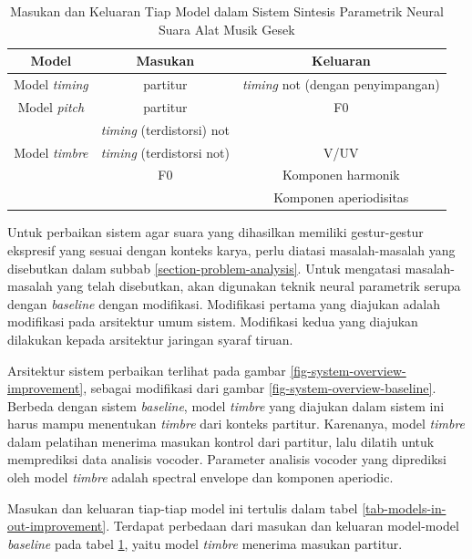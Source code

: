 \begin{table}[h]
    \centering
    \caption{Masukan dan Keluaran Tiap Model dalam Sistem Sintesis Parametrik Neural Suara Alat Musik Gesek }\label{tab-models-in-out-baseline}
    \begin{tabular}{ |c|c|c| } 
     \hline
     Model & Masukan & Keluaran \\
     \hline 
     Model \textit{timing} & partitur & \textit{timing} not (dengan penyimpangan) \\ 
     \hline
     Model \textit{pitch} & partitur & F0 \\ 
      & \textit{timing} (terdistorsi) not  & \\ 
     \hline
     Model \textit{timbre} & \textit{timing} (terdistorsi not) & V/UV \\ 
      & F0& Komponen harmonik\\ 
      &   & Komponen aperiodisitas\\ 
     \hline
    \end{tabular}
\end{table}

Untuk perbaikan sistem agar suara yang dihasilkan memiliki gestur-gestur ekspresif yang sesuai dengan konteks karya, perlu diatasi masalah-masalah yang disebutkan dalam subbab \ref{section-problem-analysis}.
Untuk mengatasi masalah-masalah yang telah disebutkan, akan digunakan teknik neural parametrik serupa dengan \textit{baseline}\parencite{bonada2017singing} dengan modifikasi. Modifikasi pertama yang diajukan adalah modifikasi pada arsitektur umum sistem. Modifikasi kedua yang diajukan dilakukan kepada arsitektur jaringan syaraf tiruan.

Arsitektur sistem perbaikan terlihat pada gambar \ref{fig-system-overview-improvement}, sebagai modifikasi dari gambar \ref{fig-system-overview-baseline}. Berbeda dengan sistem \textit{baseline}, model \textit{timbre} yang diajukan dalam sistem ini harus mampu menentukan \textit{timbre} dari konteks partitur. Karenanya, model \textit{timbre} dalam pelatihan menerima masukan kontrol dari partitur, lalu dilatih untuk memprediksi data analisis vocoder. Parameter analisis vocoder yang diprediksi oleh model \textit{timbre} adalah spectral envelope dan komponen aperiodic.

Masukan dan keluaran tiap-tiap model ini tertulis dalam tabel \ref{tab-models-in-out-improvement}. Terdapat perbedaan dari masukan dan keluaran model-model \textit{baseline} pada tabel \ref{tab-models-in-out-baseline}, yaitu model \textit{timbre} menerima masukan partitur.


